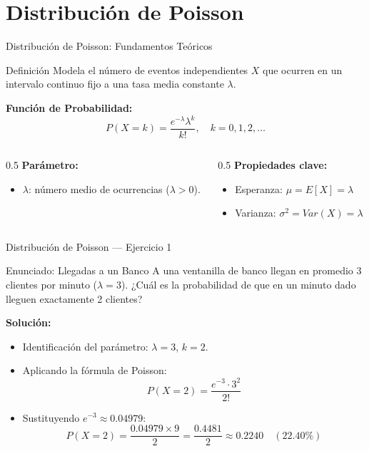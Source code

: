 \documentclass[aspectratio=169, 10pt]{beamer}
\begin{document}
\section{Distribución de Poisson}

\begin{frame}{Distribución de Poisson: Fundamentos Teóricos}
    \begin{block}{Definición}
        Modela el número de eventos independientes $X$ que ocurren en un intervalo continuo fijo a una tasa media constante $\lambda$.
    \end{block}
    
    \vspace{0.2cm}
    \textbf{Función de Probabilidad:}
    $$P(X = k) = \frac{e^{-\lambda} \lambda^k}{k!}, \quad k = 0, 1, 2, \dots$$

    \begin{columns}
        \begin{column}{0.5\textwidth}
            \textbf{Parámetro:}
            \begin{itemize}
                \item $\lambda$: número medio de ocurrencias ($\lambda > 0$).
            \end{itemize}
        \end{column}
        \begin{column}{0.5\textwidth}
            \textbf{Propiedades clave:}
            \begin{itemize}
                \item Esperanza: $\mu = E[X] = \lambda$
                \item Varianza: $\sigma^2 = Var(X) = \lambda$
            \end{itemize}
        \end{column}
    \end{columns}
\end{frame}

\begin{frame}{Distribución de Poisson — Ejercicio 1}
    \begin{exampleblock}{Enunciado: Llegadas a un Banco}
        A una ventanilla de banco llegan en promedio 3 clientes por minuto ($\lambda = 3$). ¿Cuál es la probabilidad de que en un minuto dado lleguen exactamente 2 clientes?
    \end{exampleblock}
    \pause
    \textbf{Solución:}
    \begin{itemize}
        \item Identificación del parámetro: $\lambda = 3$, $k = 2$.
        \item Aplicando la fórmula de Poisson:
        $$P(X = 2) = \frac{e^{-3} \cdot 3^2}{2!}$$
        \item Sustituyendo $e^{-3} \approx 0.04979$:
        $$P(X = 2) = \frac{0.04979 \times 9}{2} = \frac{0.4481}{2} \approx \mathbf{0.2240} \quad (22.40\%)$$
    \end{itemize}
\end{frame}
\end{document}
